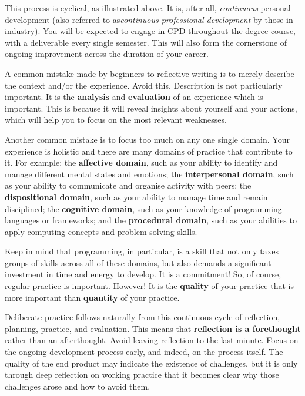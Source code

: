 \documentclass{../../fal_assignment}
\begin{document}
This process is cyclical, as illustrated above. It is, after all, \textit{continuous} personal development (also referred to as\textit{continuous professional development} by those in industry). You will be expected to engage in CPD throughout the degree course, with a deliverable every single semester. This will also form the cornerstone of ongoing improvement across the duration of your career.

A common mistake made by beginners to reflective writing is to merely describe the context and/or the experience. Avoid this. Description is not particularly important. It is the \textbf{analysis} and \textbf{evaluation} of an experience which is important. This is because it will reveal insights about yourself and your actions, which will help you to focus on the most relevant weaknesses.

Another common mistake is to focus too much on any one single domain. Your experience is holistic and there are many domains of practice that contribute to it. For example: the \textbf{affective domain}, such as your ability to identify and manage different mental states and emotions; the \textbf{interpersonal domain}, such as your ability to communicate and organise activity with peers; the \textbf{dispositional domain}, such as your ability to manage time and remain disciplined; the \textbf{cognitive domain}, such as your knowledge of programming languages or frameworks; and the \textbf{procedural domain}, such as your abilities to apply computing concepts and problem solving skills. 

Keep in mind that programming, in particular, is a skill that not only taxes groups of skills across all of these domains, but also demands a significant investment in time and energy to develop. It is a commitment! So, of course, regular practice is important. However! It is the \textbf{quality} of your practice that is more important than \textbf{quantity} of your practice.

Deliberate practice follows naturally from this continuous cycle of reflection, planning, practice, and evaluation. This means that \textbf{reflection is a forethought} rather than an afterthought. Avoid leaving reflection to the last minute. Focus on the ongoing development process early, and indeed, on the process itself. The quality of the end product may indicate the existence of challenges, but it is only through deep reflection on working practice that it becomes clear why those challenges arose and how to avoid them.
\end{document}
